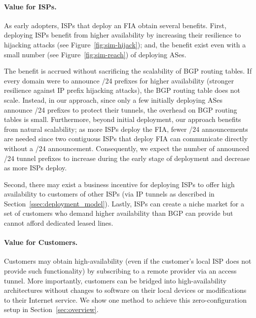 \paragraph{Value for ISPs.} As early adopters, ISPs that deploy an FIA obtain
several benefits.  First, deploying ISPs benefit from higher availability by
increasing their resilience to hijacking attacks (see
Figure~\ref{fig:sim-hijack}); and, the benefit exist even with a small number
(see Figure~\ref{fig:sim-reach}) of deploying ASes.

The benefit is accrued without sacrificing the scalability of BGP routing
tables. If every domain were to announce /24 prefixes for higher availability
(\ie stronger resilience against IP prefix hijacking attacks), the BGP routing
table does not scale.  Instead, in our approach, since only a few initially
deploying ASes announce /24 prefixes to protect their tunnels, the overhead on
BGP routing tables is small. Furthermore, beyond initial deployment, our
approach benefits from natural scalability; as more ISPs deploy the FIA, fewer
/24 announcements are needed since two contiguous ISPs that deploy FIA can
communicate directly without a /24 announcement.  Consequently, we expect the
number of announced /24 tunnel prefixes to increase during the early stage of
deployment and decrease as more ISPs deploy.

Second, there may exist a business incentive for deploying ISPs to offer high
availability to customers of other ISPs (\eg via IP tunnels as described in
Section~\ref{ssec:deployment_model}). Lastly, ISPs can create a niche market
for a set of customers who demand higher availability than BGP can provide but
cannot afford dedicated leased lines.

\paragraph{Value for Customers.} Customers may obtain high-availability (even
if the customer's local ISP does not provide such functionality) by subscribing
to a remote provider via an access tunnel.  More importantly, customers can be
bridged into high-availability architectures without changes to software on
their local devices or modifications to their Internet service. We show one
method to achieve this zero-configuration setup in Section~\ref{sec:overview}. 

